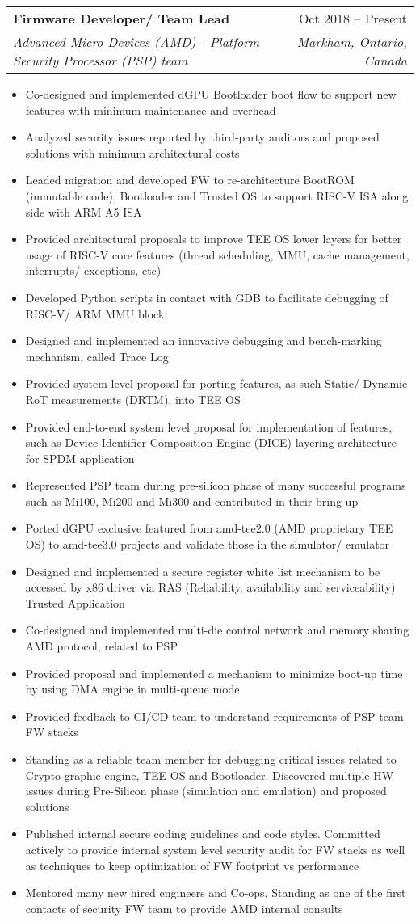 \documentclass[letterpaper,11pt]{article}
\makeatletter
\newcommand{\resumeItem}[1]{
  \item{
    {#1 \vspace{-4pt}}
  }
}
\newcommand{\resumeSubheading}[4]{
  \vspace{-2pt}\item
    \begin{tabular*}{0.97\textwidth}[t]{l@{\extracolsep{\fill}}r}
      \textbf{#1} & #2 \\
      \textit{\small #3} & \textit{\small #4} \\
    \end{tabular*}\vspace{-10pt}
}
\newcommand{\resumeItemListStart}{\begin{itemize}}
\newcommand{\resumeItemListEnd}{\end{itemize}\vspace{-2pt}}
\makeatother
\begin{document}
\resumeSubheading
        {Firmware Developer/ Team Lead}{Oct 2018 -- Present}
        {Advanced Micro Devices (AMD) - Platform Security Processor (PSP) team}{Markham, Ontario, Canada}
      \resumeItemListStart
        \small
\resumeItem{Co-designed and implemented dGPU Bootloader boot flow to support new features with minimum maintenance and overhead}
\resumeItem{Analyzed security issues reported by third-party auditors and proposed solutions with minimum architectural costs}
\resumeItem{Leaded migration and developed FW to re-architecture BootROM (immutable code), Bootloader and Trusted OS to support RISC-V ISA along side with ARM A5 ISA}
\resumeItem{Provided architectural proposals to improve TEE OS lower layers for better usage of RISC-V core features (thread scheduling, MMU, cache management, interrupts/ exceptions, etc)}
\resumeItem{Developed Python scripts in contact with GDB to facilitate debugging of RISC-V/ ARM MMU block}
\resumeItem{Designed and implemented an innovative debugging and bench-marking mechanism, called Trace Log}
\resumeItem{Provided system level proposal for porting features, as such  Static/ Dynamic RoT measurements (DRTM), into TEE OS}
\resumeItem{Provided end-to-end system level proposal for implementation of features, such as Device Identifier Composition Engine (DICE) layering architecture for SPDM application}
\resumeItem{Represented PSP team during pre-silicon phase of many successful programs such as Mi100, Mi200 and Mi300 and contributed in their bring-up}
\resumeItem{Ported dGPU exclusive featured from amd-tee2.0 (AMD proprietary TEE OS) to amd-tee3.0 projects and validate those in the simulator/ emulator}
\resumeItem{Designed and implemented a secure register white list mechanism to be accessed by x86 driver via RAS (Reliability, availability and serviceability) Trusted Application}
\resumeItem{Co-designed and implemented multi-die control network and memory sharing AMD protocol, related to PSP} 
\resumeItem{Provided proposal and implemented a mechanism to minimize boot-up time by using DMA engine in multi-queue mode}
\resumeItem{Provided feedback to CI/CD team to understand requirements of PSP team FW stacks}
\resumeItem{Standing as a reliable team member for debugging critical issues related to Crypto-graphic engine, TEE OS and Bootloader. Discovered multiple HW issues during Pre-Silicon phase (simulation and emulation) and proposed solutions}
\resumeItem{Published internal secure coding guidelines and code styles. Committed actively to provide internal system level security audit for FW stacks as well as techniques to keep optimization of FW footprint vs performance}
\resumeItem{Mentored many new hired engineers and Co-ops. Standing as one of the first contacts of security FW team to provide AMD internal consults}
    \resumeItemListEnd
\end{document}
